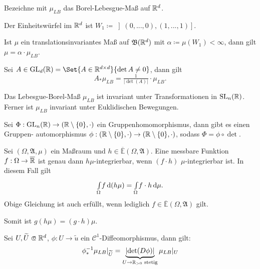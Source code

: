 \documentclass{cheat-sheet}
\newcommand{\Alg}{\mathfrak{A}} %
\newcommand{\Bor}{\mathfrak{B}} %
\newcommand{\E}{\mathbb{E}} %
\newcommand{\IntO}[2]{\Int{\Omega}{}{#1}{#2}} %
\newcommand{\IntOmu}[1]{\Int{\Omega}{}{#1}{\mu}} %
\begin{document}
\begin{nota}
  Bezeichne mit $\mu_{LB}$ das Borel-Lebesgue-Maß auf $\mathbb{R}^d$.
\end{nota}

\begin{nota}
  Der Einheitswürfel im $\mathbb{R}^d$ ist $W_1 \coloneqq \left](0, ..., 0), (1, ..., 1)\right]$.
\end{nota}

\begin{satz}
  Ist $\mu$ ein translationsinvariantes Maß auf $\Bor(\R^d)$ mit $\alpha \coloneqq \mu(W_1) < \infty$, dann gilt $\mu = \alpha \cdot \mu_{LB}$.
\end{satz}

\begin{satz}
  Sei $A \in \mathrm{GL}_d(\R) = \Set{ A \in \R^{d \times d} }{ \det A \not= 0 }$, dann gilt
  \[ A_* \mu_{LB} = \tfrac{1}{\left|\det(A)\right|} \cdot \mu_{LB}. \]
\end{satz}

\begin{satz}
  Das Lebesgue-Borel-Maß $\mu_{LB}$ ist invariant unter Transformationen in $\mathrm{SL}_n(\mathbb{R})$. Ferner ist $\mu_{LB}$ invariant unter Euklidischen Bewegungen.
\end{satz}

\begin{satz}
  Sei $\Phi : \mathrm{GL}_n(\mathbb{R}) \to (\mathbb{R} \setminus \{0\}, \cdot)$ ein Gruppenhomomorphismus, dann gibt es einen Gruppen- automorphismus $\phi : (\mathbb{R} \setminus \{0\}, \cdot) \to (\mathbb{R} \setminus \{0\}, \cdot)$, sodass $\Phi = \phi \circ \det$.
\end{satz}

\begin{satz}
  Sei $(\Omega, \Alg, \mu)$ ein Maßraum und $h \in \overline{\E}(\Omega, \Alg)$. Eine messbare Funktion $f : \Omega \to \overline{\mathbb{R}}$ ist genau dann $h\mu$-integrierbar, wenn $(f \cdot h)$ $\mu$-integrierbar ist. In diesem Fall gilt
  \[ \IntO{f}{(h \mu)} = \IntOmu{f \cdot h}. \]
  Obige Gleichung ist auch erfüllt, wenn lediglich $f \in \overline{\E}(\Omega, \Alg)$ gilt.
\end{satz}

\begin{bem}
  Somit ist $g (h \mu) = (g \cdot h) \mu$.
\end{bem}

\begin{satz}
  Sei $U, \widetilde{U} \opn \R^d$, $\phi : U \to \widetilde{u}$ ein $\mathcal{C}^1$-Diffeomorphismus, dann gilt:
    \[ \phi_*^{-1} \mu_{LB}|_{\widetilde{U}} = \underbrace{\left|\det(D \phi)\right|}_{U \to \mathbb{R}_{> 0} \text{ stetig}} \mu_{LB}|_U \]
\end{satz}
\end{document}
